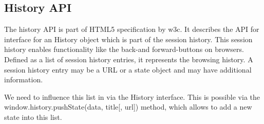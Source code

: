 \subsection{History API}
The history API is part of HTML5 specification by \gls{w3c}.
It describes the API for interface for an History object which is part of the session history.
This session history enables functionality like the back-and forward-buttons on browsers.
Defined as a list of session history entries, it represents the browsing history.
A session history entry may be a URL or a state object and may have additional information.

We need to influence this list in \lare{} via the History interface.
This is possible via the window.history.pushState(data, title[, url]) method, which allows to add a new state into this list.

